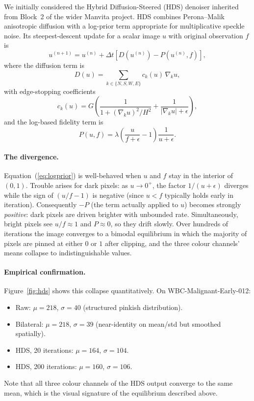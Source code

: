 \documentclass[conference,10pt]{IEEEtran}
\begin{document}
We initially considered the Hybrid Diffusion-Steered (HDS) denoiser inherited from Block~2 of the wider Manvita project. HDS combines Perona--Malik anisotropic diffusion with a log-prior term appropriate for multiplicative speckle noise. Its steepest-descent update for a scalar image $u$ with original observation $f$ is
\begin{equation}
  u^{(n+1)} = u^{(n)} + \Delta t \left[ D(u^{(n)}) - P(u^{(n)}, f) \right],
  \label{eq:hds}
\end{equation}
where the diffusion term is
\begin{equation}
  D(u) = \sum_{k \in \{N,S,W,E\}} c_k(u)\, \nabla_k u,
\end{equation}
with edge-stopping coefficients
\begin{equation}
  c_k(u) = G \left( \frac{1}{1 + (\nabla_k u)^2 / H^2}
                  + \frac{1}{|\nabla_k u| + \epsilon} \right),
\end{equation}
and the log-based fidelity term is
\begin{equation}
  P(u, f) = \lambda \left(\frac{u}{f + \epsilon} - 1\right) \frac{1}{u + \epsilon}.
  \label{eq:logprior}
\end{equation}

\paragraph{The divergence.} Equation~(\ref{eq:logprior}) is well-behaved when $u$ and $f$ stay in the interior of $(0,1)$. Trouble arises for dark pixels: as $u \to 0^+$, the factor $1/(u+\epsilon)$ diverges while the sign of $(u/f - 1)$ is negative (since $u < f$ typically holds early in iteration). Consequently $-P$ (the term actually applied to $u$) becomes strongly \emph{positive}: dark pixels are driven brighter with unbounded rate. Simultaneously, bright pixels see $u/f \approx 1$ and $P \approx 0$, so they drift slowly. Over hundreds of iterations the image converges to a bimodal equilibrium in which the majority of pixels are pinned at either $0$ or $1$ after clipping, and the three colour channels' means collapse to indistinguishable values.

\paragraph{Empirical confirmation.} Figure~\ref{fig:hds} shows this collapse quantitatively. On WBC-Malignant-Early-012:
\begin{itemize}
  \item Raw:   $\mu = 218$, $\sigma = 40$ (structured pinkish distribution).
  \item Bilateral: $\mu = 218$, $\sigma = 39$ (near-identity on mean/std but smoothed spatially).
  \item HDS, 20 iterations:  $\mu = 164$, $\sigma = 104$.
  \item HDS, 200 iterations: $\mu = 160$, $\sigma = 106$.
\end{itemize}
Note that all three colour channels of the HDS output converge to the same mean, which is the visual signature of the equilibrium described above.
\end{document}
